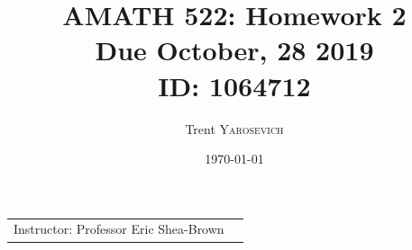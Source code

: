 \documentclass{article}
\title{AMATH 522: Homework 2 \\Due October, 28 2019 \\ ID: 1064712} %
\author{Trent \textsc{Yarosevich}} %
\date{\today} %
\begin{document}
\maketitle %
\setlength\parindent{1cm}

\begin{center}
\begin{tabular}{l r}
Instructor: Professor Eric Shea-Brown %
\end{tabular}
\end{center}
\doublespacing

\end{document}
